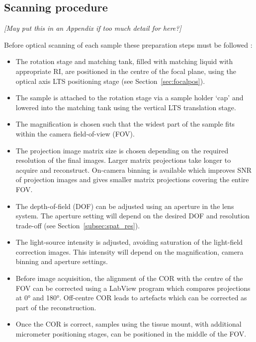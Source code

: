 \subsection{Scanning procedure}

\textit{[May put this in an Appendix if too much detail for here?]}

Before optical scanning of each sample these preparation steps must be followed :

\begin{itemize}
	\item The rotation stage and matching tank, filled with matching liquid with appropriate RI, are positioned in the centre of the focal plane, using the optical axis LTS positioning stage (see Section~\ref{sec:focalpos}).
	
	\item The sample is attached to the rotation stage via a sample holder `cap' and lowered into the matching tank using the vertical LTS translation stage.
	
	\item The magnification is chosen such that the widest part of the sample fits within the camera field-of-view (FOV). 
	
	\item The projection image matrix size is chosen depending on the required resolution of the final images. Larger matrix projections take longer to acquire and reconstruct. On-camera binning is available which improves SNR of projection images and gives smaller matrix projections covering the entire FOV.
	
	\item The depth-of-field (DOF) can be adjusted using an aperture in the lens system. The aperture setting will depend on the desired DOF and resolution trade-off (see Section~\ref{subsec:spat_res}).
	
	\item The light-source intensity is adjusted, avoiding saturation of the  light-field correction images. This intensity will depend on the magnification, camera binning and aperture settings. 
	
	\item Before image acquisition, the alignment of the COR with the centre of the FOV can be corrected using a LabView program which compares projections at \ang{0} and \ang{180}. Off-centre COR leads to artefacts which can be corrected as part of the reconstruction. 
	
	\item Once the COR is correct, samples using the tissue mount, with additional micrometer positioning stages, can  be positioned in the middle of the FOV.
	

\end{itemize}
